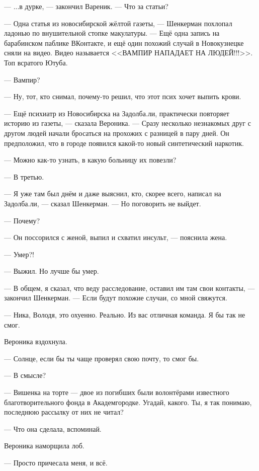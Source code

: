 --- ...в дурке, --- закончил Вареник.
--- Что за статьи?

--- Одна статья из новосибирской жёлтой газеты, --- Шенкерман похлопал ладонью по внушительной стопке макулатуры.
--- Ещё одна запись на барабинском паблике ВКонтакте, и ещё один похожий случай в Новокузнецке сняли на видео.
Видео называется <<ВАМПИР НАПАДАЕТ НА ЛЮДЕЙ!!!>>.
Топ всратого Ютуба.

--- Вампир?

--- Ну, тот, кто снимал, почему-то решил, что этот псих хочет выпить крови.

--- Ещё психиатр из Новосибирска на Задолба.ли, практически повторяет историю из газеты, --- сказала Вероника.
--- Сразу несколько незнакомых друг с другом людей начали бросаться на прохожих с разницей в пару дней.
Он предположил, что в городе появился какой-то новый синтетический наркотик.

--- Можно как-то узнать, в какую больницу их повезли?

--- В третью.

--- Я уже там был днём и даже выяснил, кто, скорее всего, написал на Задолба.ли, --- сказал Шенкерман.
--- Но поговорить не выйдет.

--- Почему?

--- Он поссорился с женой, выпил и схватил инсульт, --- пояснила жена.

--- Умер?!

--- Выжил.
Но лучше бы умер.

--- В общем, я сказал, что веду расследование, оставил им там свои контакты, --- закончил Шенкерман.
--- Если будут похожие случаи, со мной свяжутся.

--- Ника, Володя, это охуенно.
Реально.
Из вас отличная команда.
Я бы так не смог.

Вероника вздохнула.

--- Солнце, если бы ты чаще проверял свою почту, то смог бы.

--- В смысле?

--- Вишенка на торте --- двое из погибших были волонтёрами известного благотворительного фонда в Академгородке.
Угадай, какого.
Ты, я так понимаю, последнюю рассылку от них не читал?

\asterism

\textspace

--- Что она сделала, вспоминай.

Вероника наморщила лоб.

--- Просто причесала меня, и всё.

